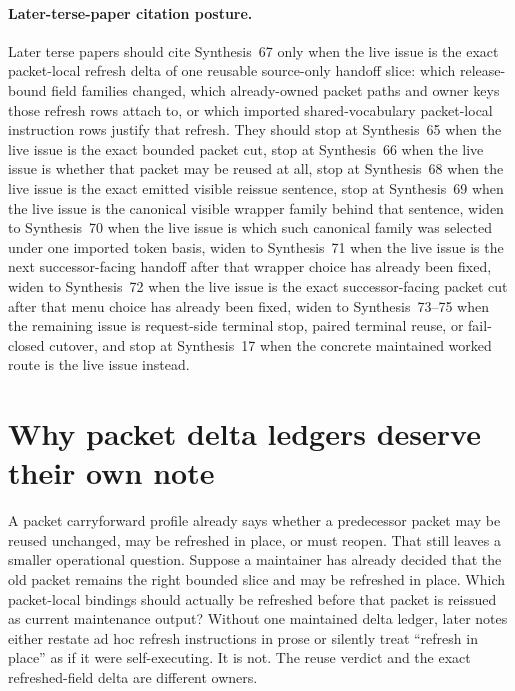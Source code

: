 \documentclass[11pt]{article}
\begin{document}
\paragraph{Later-terse-paper citation posture.}
Later terse papers should cite Synthesis~67 only when the live issue is the exact packet-local refresh delta of one reusable source-only handoff slice: which release-bound field families changed, which already-owned packet paths and owner keys those refresh rows attach to, or which imported shared-vocabulary packet-local instruction rows justify that refresh. They should stop at Synthesis~65 when the live issue is the exact bounded packet cut, stop at Synthesis~66 when the live issue is whether that packet may be reused at all, stop at Synthesis~68 when the live issue is the exact emitted visible reissue sentence, stop at Synthesis~69 when the live issue is the canonical visible wrapper family behind that sentence, widen to Synthesis~70 when the live issue is which such canonical family was selected under one imported token basis, widen to Synthesis~71 when the live issue is the next successor-facing handoff after that wrapper choice has already been fixed, widen to Synthesis~72 when the live issue is the exact successor-facing packet cut after that menu choice has already been fixed, widen to Synthesis~73--75 when the remaining issue is request-side terminal stop, paired terminal reuse, or fail-closed cutover, and stop at Synthesis~17 when the concrete maintained worked route is the live issue instead.\cite{series:publicrequestresponsepackets,series:publicrequestresponsepacketcarryforward,series:publicrequestresponsepacketrefreshnotices,series:publicrequestresponsepacketrefreshnormalforms,series:publicrequestresponsepacketrefreshselections,series:publicrequestresponsepacketrefreshresponsemenus,series:publicrequestresponsepacketrefreshresponsepackets,series:publicrequestresponsepacketrefreshresponsepacketclosureverdicts,series:pairedterminalcitationdiscipline,series:pairedterminalcutoverrule,series:workedexample}

\section{Why packet delta ledgers deserve their own note}
A packet carryforward profile already says whether a predecessor packet may be reused unchanged, may be refreshed in place, or must reopen.
That still leaves a smaller operational question.
Suppose a maintainer has already decided that the old packet remains the right bounded slice and may be refreshed in place.
Which packet-local bindings should actually be refreshed before that packet is reissued as current maintenance output?
Without one maintained delta ledger, later notes either restate ad hoc refresh instructions in prose or silently treat ``refresh in place'' as if it were self-executing.
It is not.
The reuse verdict and the exact refreshed-field delta are different owners.
\end{document}
